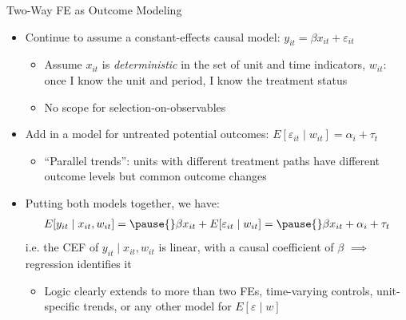 \documentclass[11pt, english]{beamer}
\begin{document}
	\begin{frame}{Two-Way FE as Outcome Modeling}
		\vspace{0.2cm}
		\begin{itemize}
			\item Continue to assume a constant-effects causal model:
				$y_{it}=\beta x_{it}+\varepsilon_{it}$
				\smallskip
				\begin{itemize}
					\item Assume $x_{it}$ is \emph{deterministic} in the set of unit and
						time indicators, $w_{it}$: once I know the unit and period, I know the
						treatment status
						\smallskip

					\item No scope for selection-on-observables
				\end{itemize}
				\bigskip
				\pause{}

			\item Add in a model for untreated potential outcomes:
				$E[\varepsilon_{it}\mid w_{it}]=\alpha_{i} + \tau_{t}$
				\smallskip
				\begin{itemize}
					\item ``Parallel trends'': units with different treatment paths have
						different outcome levels but common outcome changes
				\end{itemize}
				\bigskip
				\pause{}

			\item Putting both models together, we have:
				\begin{align*}
					E[y_{it}\mid x_{it},w_{it}] = \pause{}\beta x_{it}+ E[\varepsilon_{it}\mid w_{it}]=\pause{}\beta x_{it}+\alpha_{i} + \tau_{t}
				\end{align*}\pause{} i.e. the CEF of $y_{it}\mid x_{it},w_{it}$ is
				linear, with a causal coefficient of $\beta$ $\implies$ regression identifies
				it
				\smallskip
				\pause{}
				\begin{itemize}
					\item Logic clearly extends to more than two FEs, time-varying
						controls, unit-specific trends, or any other model for
						$E[\varepsilon\mid w]$
				\end{itemize}
		\end{itemize}
	\end{frame}
\end{document}
